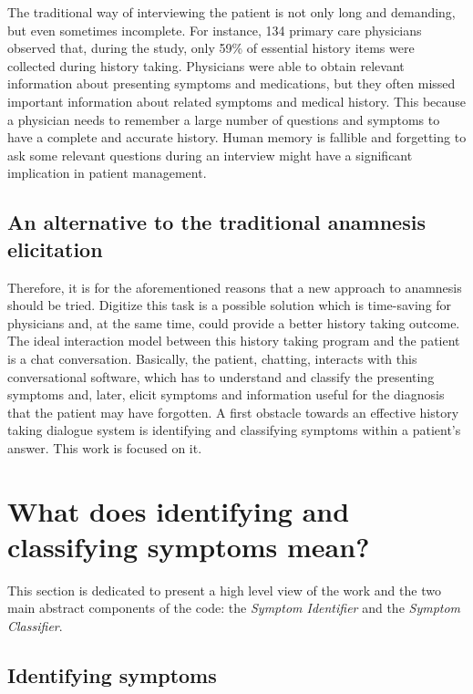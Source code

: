 The traditional way of interviewing the patient is not only long and demanding, but even sometimes incomplete. For instance, 134 primary care physicians observed that, during the study, only 59\% of essential history items were collected during history taking. Physicians were able to obtain relevant information about presenting symptoms and medications, but they often missed important information about related symptoms and medical history. This because a physician needs to remember a large number of questions and symptoms to have a complete and accurate history. Human memory is fallible and forgetting to ask some relevant questions during an interview might have a significant implication in patient management.\cite{johndocument}

\subsection{An alternative to the traditional anamnesis elicitation}

Therefore, it is for the aforementioned reasons that a new approach to anamnesis should be tried. Digitize this task is a possible solution which is time-saving for physicians and, at the same time, could provide a better history taking outcome. The ideal interaction model between this history taking program and the patient is a chat conversation. Basically, the patient, chatting, interacts with this conversational software, which has to understand and classify the presenting symptoms and, later, elicit symptoms and information useful for the diagnosis that the patient may have forgotten. A first obstacle towards an effective history taking dialogue system is identifying and classifying symptoms within a patient’s answer. This work is focused on it.

\section{What does identifying and classifying symptoms mean?}

This section is dedicated to present a high level view of the work and the two main abstract components of the code: the \textit{Symptom Identifier} and the \textit{Symptom Classifier}. 

\label{sec:identifying_classifying}
\subsection{Identifying symptoms}

